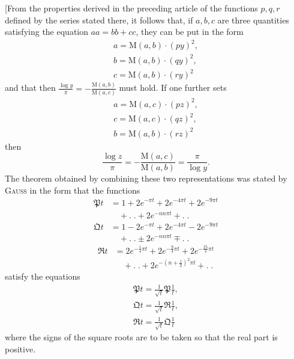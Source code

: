 \begingroup
\renewcommand{\arraystretch}{1.45}
[From the properties derived in the preceding article of the functions $p,q,r$ defined by the series stated there, it follows that, if $a,b,c$ are three quantities satisfying the equation $aa=bb+cc$, they can be put in the form
\[
\begin{gathered}a=\mathrm M(a,b)\cdot(py)^2,\\[5pt] b=\mathrm M(a,b)\cdot(qy)^2,\\[5pt] c=\mathrm M(a,b)\cdot(ry)^2\end{gathered}
\]
and that then $\frac{\log y}{\pi}=-\frac{\mathrm M(a,b)}{\mathrm M(a,c)}$ must hold. If one further sets
\[
\begin{gathered}a=\mathrm M(a,c)\cdot(pz)^2,\\[5pt] c=\mathrm M(a,c)\cdot(qz)^2,\\[5pt] b=\mathrm M(a,b)\cdot(rz)^2\end{gathered}
\]
then
\[
\frac{\log z}{\pi}=-\frac{\mathrm M(a,c)}{\mathrm M(a,b)}=\frac{\pi}{\log y}.
\]
The theorem obtained by combining these two representations was stated by \textsc{Gauss} in the form that the functions
\[
\begin{aligned}\mathfrak P t&=1+2e^{-\pi t}+2e^{-4\pi t}+2e^{-9\pi t}\\&\quad+.\;.+2e^{-nn\pi t}+.\;.\end{aligned}
\]
\[
\begin{aligned}\mathfrak Q t&=1-2e^{-\pi t}+2e^{-4\pi t}-2e^{-9\pi t}\\&\quad+.\;.\pm2e^{-nn\pi t}\mp.\;.\end{aligned}
\]
\[
\begin{aligned}\mathfrak R t&=2e^{-\frac14\pi t}+2e^{-\frac94\pi t}+2e^{-\frac{25}4\pi t}\\&\quad+.\;.+2e^{-(n+\frac12)^2\pi t}+.\;.\end{aligned}
\]
satisfy the equations
\[
\begin{gathered}\mathfrak{P}t=\frac1{\surd t}\mathfrak{P}\frac1t,\\[5pt]
\mathfrak{Q}t=\frac1{\surd t}\mathfrak{R}\frac1t,\\[5pt]
\mathfrak{R}t=\frac1{\surd t}\mathfrak{Q}\frac1t\end{gathered}
\]
where the signs of the square roots are to be taken so that the real part is positive.

